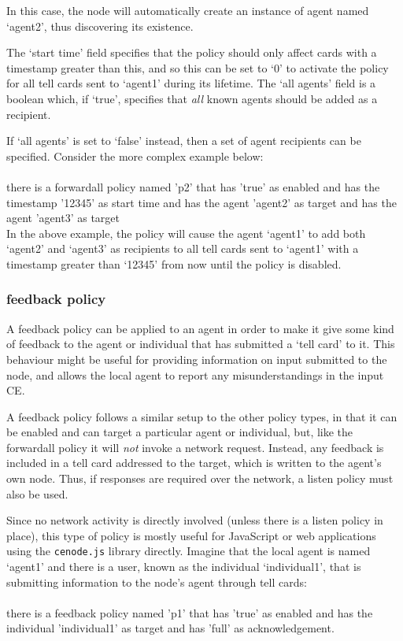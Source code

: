 \documentclass{scrartcl}
\newcommand{\ce}[1]{\textsf{#1}}
\newcommand{\js}[1]{\texttt{#1}}
\begin{document}
In this case, the node will automatically create an instance of agent named `agent2', thus discovering its existence.

The `start time' field specifies that the policy should only affect cards with a timestamp greater than this, and so this can be set to `0' to activate the policy for all tell cards sent to `agent1' during its lifetime. The `all agents' field is a boolean which, if `true', specifies that \textit{all} known agents should be added as a recipient.

If `all agents' is set to `false' instead, then a set of agent recipients can be specified. Consider the more complex example below:\\
\\\ce{there is a forwardall policy named 'p2' that has 'true' as enabled and has the timestamp '12345' as start time and has the agent 'agent2' as target and has the agent 'agent3' as target}\\

In the above example, the policy will cause the agent `agent1' to add both `agent2' and `agent3' as recipients to all tell cards sent to `agent1' with a timestamp greater than `12345' from now until the policy is disabled.

\subsubsection{\ce{feedback policy}}
A \ce{feedback policy} can be applied to an agent in order to make it give some kind of feedback to the agent or individual that has submitted a `tell card' to it. This behaviour might be useful for providing information on input submitted to the node, and allows the local agent to report any misunderstandings in the input CE.

A \ce{feedback policy} follows a similar setup to the other policy types, in that it can be enabled and can target a particular agent or individual, but, like the \ce{forwardall policy} it will \textit{not} invoke a network request. Instead, any feedback is included in a \ce{tell card} addressed to the target, which is written to the agent's own node. Thus, if responses are required over the network, a \ce{listen policy} must also be used.

Since no network activity is directly involved (unless there is a \ce{listen policy} in place), this type of policy is mostly useful for JavaScript or web applications using the \js{cenode.js} library directly. Imagine that the local agent is named `agent1' and there is a user, known as the individual `individual1', that is submitting information to the node's agent through \ce{tell card}s:\\
\\\ce{there is a feedback policy named 'p1' that has 'true' as enabled and has the individual 'individual1' as target and has 'full' as acknowledgement.}\\
\end{document}
